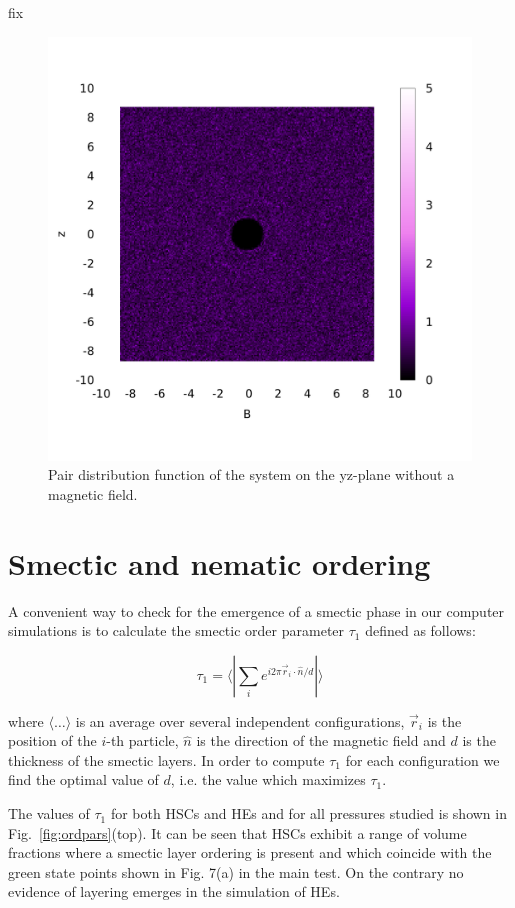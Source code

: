 \documentclass[aip,graphicx]{revtex4-1}
\begin{document}
fix
\begin{figure}
    \centering
    \includegraphics[width=0.7\columnwidth]{gyz_noB.png}
    \caption{Pair distribution function of the system on the yz-plane without a magnetic field.}
    \label{fig:gyz_noB}
\end{figure}

\newpage

\section{Smectic and nematic ordering}

A convenient way to check for the emergence of a smectic phase in our computer simulations 
is to calculate the smectic order parameter $\tau_1$ defined as follows:

\begin{equation}
    \tau_1 = \langle | \sum_i e^{i 2\pi \vec{r}_i \cdot \hat{n} / d } |\rangle 
\end{equation}

where $\langle\ldots\rangle$ is an average over several independent configurations, $\vec{r}_i$ is the position of the $i$-th particle, $\hat{n}$ is the direction of the magnetic
field and $d$ is the thickness of the smectic layers.
In order to compute $\tau_1$ for each configuration we find the optimal value of $d$, i.e. 
the value which maximizes $\tau_1$.

The values of $\tau_1$ for both HSCs and HEs and for all pressures studied is shown in Fig.~\ref{fig:ordpars}(top). It can be seen that HSCs exhibit a range of volume fractions where 
a smectic layer ordering is present and which coincide with the green state points shown in Fig. 7(a)
in the main test. On the contrary no evidence of layering emerges in the simulation of HEs.
\end{document}
